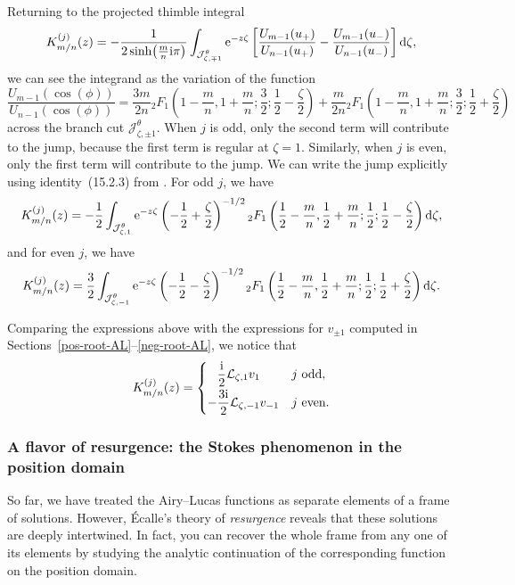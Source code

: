 \documentclass[pdftex]{sigma}
\newcommand{\laplace}{\mathcal{L}}
\numberwithin{equation}{section}
\begin{document}
Returning to the projected thimble integral
\[ K^{(j)}_{m/n}(z) = -\frac{1}{2\sinh\bigl(\frac{m}{n} {\rm i}\pi\bigr)} \int_{\mathcal{J}^\theta_{\zeta, \mp 1}} {\rm e}^{-z\zeta} \left[ \frac{U_{m-1}(u_+)}{U_{n-1}(u_+)} - \frac{U_{m-1}(u_-)}{U_{n-1}(u_-)} \right] {\rm d}\zeta, \]
we can see the integrand as the variation of the function
\[ \frac{U_{m-1}(\cos(\phi))}{U_{n-1}(\cos(\phi))} = \frac{3m}{2n} {}_2F_1\left(1 - \frac{m}{n}, 1 + \frac{m}{n}; \frac{3}{2};\frac{1}{2} - \frac{\zeta}{2}\right) + \frac{m}{2n} {}_2F_1\left(1 - \frac{m}{n}, 1 + \frac{m}{n}; \frac{3}{2}; \frac{1}{2} + \frac{\zeta}{2}\right) \]
across the branch cut $\mathcal{J}^\theta_{\zeta, \pm 1}$. When $j$ is odd, only the second term will contribute to the jump, because the first term is regular at $\zeta = 1$. Similarly, when $j$ is even, only the first term will contribute to the jump. We can write the jump explicitly using identity~(15.2.3) from \cite{dlmf}. For odd $j$, we have
\[ K^{(j)}_{m/n}(z) = -\frac{1}{2} \int_{\mathcal{J}^\theta_{\zeta, 1}} {\rm e}^{-z\zeta} \left(-\frac{1}{2}+\frac{\zeta}{2}\right)^{-1/2} {}_2F_1\left(\frac{1}{2} - \frac{m}{n}, \frac{1}{2} + \frac{m}{n}; \frac{1}{2}; \frac{1}{2} - \frac{\zeta}{2}\right) {\rm d}\zeta, \]
and for even $j$, we have
\[ K^{(j)}_{m/n}(z) = \frac{3}{2} \int_{\mathcal{J}^\theta_{\zeta, -1}} {\rm e}^{-z\zeta} \left(-\frac{1}{2}-\frac{\zeta}{2}\right)^{-1/2} {}_2F_1\left(\frac{1}{2} - \frac{m}{n}, \frac{1}{2} + \frac{m}{n}; \frac{1}{2}; \frac{1}{2} + \frac{\zeta}{2}\right) {\rm d}\zeta. \]

Comparing the expressions above with the expressions for $v_{\pm 1}$ computed in Sections~\ref{pos-root-AL}--\ref{neg-root-AL}, we notice that
\[ K^{(j)}_{m/n}(z) = \begin{cases}
\hphantom{-}\dfrac{\rm i}{2}\laplace_{\zeta, 1} v_1 & j \text{ odd}, \vspace{1mm}\\
-\dfrac{3{\rm i}}{2}\laplace_{\zeta, -1} v_{-1} & j \text{ even}.
\end{cases} \]

\subsubsection{A flavor of resurgence: the Stokes phenomenon in the position domain}\label{resurgence-AL}

So far, we have treated the Airy--Lucas functions as separate elements of a frame of solutions. However, \'{E}calle's theory of {\em resurgence} reveals that these solutions are deeply intertwined. In fact, you can recover the whole frame from any one of its elements by studying the analytic continuation of the corresponding function on the position domain.
\end{document}
